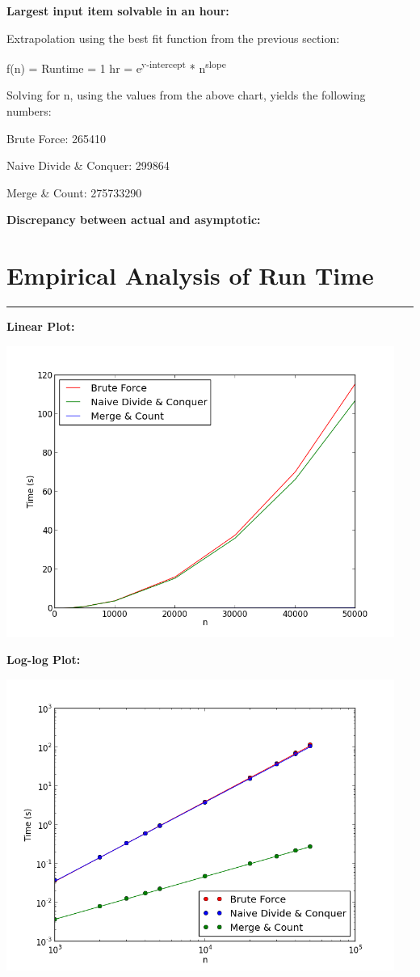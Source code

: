 \documentclass[letterpaper,10pt,titlepage,fleqn]{article}
\begin{document}
\begin{centering}
\textbf{Largest input item solvable in an hour:}
\end{centering}

Extrapolation using the best fit function from the previous section: 

f(n) = Runtime = 1 hr = e\textsuperscript{y-intercept} * n\textsuperscript{slope}

Solving for n, using the values from the above chart, yields the following numbers: 

Brute Force: 265410

Naive Divide \& Conquer: 299864

Merge \& Count: 275733290

\begin{centering}
\textbf{Discrepancy between actual and asymptotic:}
\end{centering}

\newpage

\section*{Empirical Analysis of Run Time}
\hrule

\textbf{Linear Plot:}
\vskip 0.04in
\begin{center}

\includegraphics[width=5in]{input_time.png}

\end{center}

\textbf{Log-log Plot:}
\vskip 0.04in
\begin{center}

\includegraphics[width=5in]{loglog.png}

\end{center}
\end{document}
